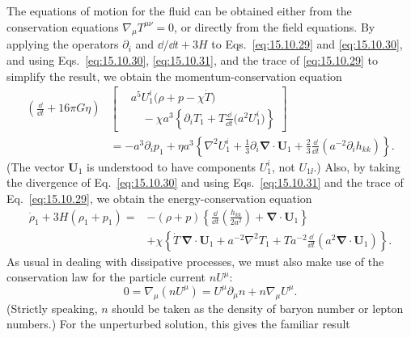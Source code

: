 The equations of motion for the fluid can be obtained either from the
conservation equations \(\nabla_\mu T^{\mu\nu}=0\), or directly from the
field equations. By applying the operators \(\partial_i\) and
\(\dd/\dd t+3H\) to Eqs.~\eqref{eq:15.10.29} and
\eqref{eq:15.10.30}, and using Eqs.~\eqref{eq:15.10.30},
\eqref{eq:15.10.31}, and the trace of \eqref{eq:15.10.29} to simplify the
result, we obtain the momentum-conservation equation
\begin{equation}
  \begin{aligned}
  \left(\frac{\dd}{\dd t}+16\pi G\eta\right)
  &\left[
    \begin{aligned}
      &a^5U_1^i\bigl(\rho+p-\chi\dot T\bigr)\\[-0.2em]
      &\quad-\chi a^3
      \left\{
        \partial_iT_1
        +T\frac{\dd}{\dd t}\bigl(a^2U_1^i\bigr)
      \right\}
    \end{aligned}
  \right]\\
  &=
  -a^3\partial_i p_1
  +\eta a^3
  \left\{
    \nabla^2U_1^i
    +\frac13\partial_i
      \boldsymbol{\nabla}\cdot\mathbf U_1
    +\frac23\frac{\dd}{\dd t}
      \left(a^{-2}\partial_i h_{kk}\right)
  \right\}.
  \end{aligned}
  \tag{15.10.32}\label{eq:15.10.32}
\end{equation}
(The vector \(\mathbf U_1\) is understood to have components \(U_1^i\),
not \(U_{1\ii}\).) Also, by taking the divergence of
Eq.~\eqref{eq:15.10.30} and using Eqs.~\eqref{eq:15.10.31} and the trace
of Eq.~\eqref{eq:15.10.29}, we obtain the energy-conservation equation
\begin{equation}
  \begin{split}
  \dot\rho_1+3H(\rho_1+p_1)
  ={}&
  -(\rho+p)
  \left\{
    \frac{\dd}{\dd t}\left(\frac{h_{kk}}{2a^2}\right)
    +\boldsymbol{\nabla}\cdot\mathbf U_1
  \right\}\\
  &+\chi
  \left\{
    \dot T\,\boldsymbol{\nabla}\cdot\mathbf U_1
    +a^{-2}\nabla^2T_1
    +Ta^{-2}\frac{\dd}{\dd t}
      \left(a^2\boldsymbol{\nabla}\cdot\mathbf U_1\right)
  \right\}.
  \end{split}
  \tag{15.10.33}\label{eq:15.10.33}
\end{equation}
As usual in dealing with dissipative processes, we must also make use of the
conservation law for the particle current \(nU^\mu\):
\[
  0=\nabla_\mu(nU^\mu)
  =U^\mu\partial_\mu n+n\nabla_\mu U^\mu.
\]
(Strictly speaking, \(n\) should be taken as the density of baryon number or
lepton numbers.) For the unperturbed solution, this gives the familiar result
